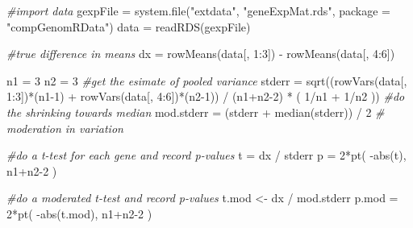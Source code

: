 \documentclass[
]{article}
\newenvironment{Shaded}{\begin{snugshade}}{\end{snugshade}}
\newcommand{\AttributeTok}[1]{\textcolor[rgb]{0.77,0.63,0.00}{#1}}
\newcommand{\CommentTok}[1]{\textcolor[rgb]{0.56,0.35,0.01}{\textit{#1}}}
\newcommand{\DecValTok}[1]{\textcolor[rgb]{0.00,0.00,0.81}{#1}}
\newcommand{\FunctionTok}[1]{\textcolor[rgb]{0.00,0.00,0.00}{#1}}
\newcommand{\NormalTok}[1]{#1}
\newcommand{\OtherTok}[1]{\textcolor[rgb]{0.56,0.35,0.01}{#1}}
\newcommand{\SpecialCharTok}[1]{\textcolor[rgb]{0.00,0.00,0.00}{#1}}
\newcommand{\StringTok}[1]{\textcolor[rgb]{0.31,0.60,0.02}{#1}}
\begin{document}
\begin{Shaded}
\begin{Highlighting}[]
\CommentTok{\#import data}
\NormalTok{gexpFile }\OtherTok{=} \FunctionTok{system.file}\NormalTok{(}\StringTok{"extdata"}\NormalTok{, }\StringTok{"geneExpMat.rds"}\NormalTok{, }\AttributeTok{package =} \StringTok{"compGenomRData"}\NormalTok{) }
\NormalTok{data }\OtherTok{=} \FunctionTok{readRDS}\NormalTok{(gexpFile)}

\CommentTok{\#true difference in means}
\NormalTok{dx }\OtherTok{=} \FunctionTok{rowMeans}\NormalTok{(data[, }\DecValTok{1}\SpecialCharTok{:}\DecValTok{3}\NormalTok{]) }\SpecialCharTok{{-}} \FunctionTok{rowMeans}\NormalTok{(data[, }\DecValTok{4}\SpecialCharTok{:}\DecValTok{6}\NormalTok{])}

\NormalTok{n1 }\OtherTok{=} \DecValTok{3}
\NormalTok{n2 }\OtherTok{=} \DecValTok{3}
\CommentTok{\#get the esimate of pooled variance }
\NormalTok{stderr }\OtherTok{=} \FunctionTok{sqrt}\NormalTok{((}\FunctionTok{rowVars}\NormalTok{(data[, }\DecValTok{1}\SpecialCharTok{:}\DecValTok{3}\NormalTok{])}\SpecialCharTok{*}\NormalTok{(n1}\DecValTok{{-}1}\NormalTok{) }\SpecialCharTok{+} \FunctionTok{rowVars}\NormalTok{(data[, }\DecValTok{4}\SpecialCharTok{:}\DecValTok{6}\NormalTok{])}\SpecialCharTok{*}\NormalTok{(n2}\DecValTok{{-}1}\NormalTok{)) }\SpecialCharTok{/}\NormalTok{ (n1}\SpecialCharTok{+}\NormalTok{n2}\DecValTok{{-}2}\NormalTok{) }\SpecialCharTok{*}\NormalTok{ ( }\DecValTok{1}\SpecialCharTok{/}\NormalTok{n1 }\SpecialCharTok{+} \DecValTok{1}\SpecialCharTok{/}\NormalTok{n2 ))}
\CommentTok{\#do the shrinking towards median}
\NormalTok{mod.stderr }\OtherTok{=}\NormalTok{ (stderr }\SpecialCharTok{+} \FunctionTok{median}\NormalTok{(stderr)) }\SpecialCharTok{/} \DecValTok{2} \CommentTok{\# moderation in variation}

\CommentTok{\#do a t{-}test for each gene and record p{-}values}
\NormalTok{t }\OtherTok{=}\NormalTok{ dx }\SpecialCharTok{/}\NormalTok{ stderr}
\NormalTok{p }\OtherTok{=} \DecValTok{2}\SpecialCharTok{*}\FunctionTok{pt}\NormalTok{( }\SpecialCharTok{{-}}\FunctionTok{abs}\NormalTok{(t), n1}\SpecialCharTok{+}\NormalTok{n2}\DecValTok{{-}2}\NormalTok{ )}

\CommentTok{\#do a moderated t{-}test and record p{-}values}
\NormalTok{t.mod }\OtherTok{\textless{}{-}}\NormalTok{ dx }\SpecialCharTok{/}\NormalTok{ mod.stderr}
\NormalTok{p.mod }\OtherTok{=} \DecValTok{2}\SpecialCharTok{*}\FunctionTok{pt}\NormalTok{( }\SpecialCharTok{{-}}\FunctionTok{abs}\NormalTok{(t.mod), n1}\SpecialCharTok{+}\NormalTok{n2}\DecValTok{{-}2}\NormalTok{ )}


\end{Highlighting}
\end{Shaded}
\end{document}
